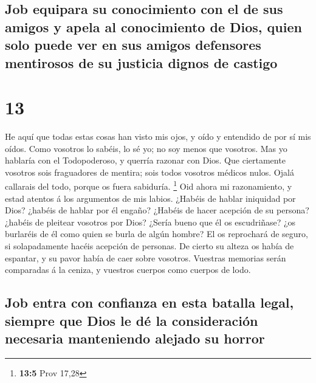 \hypertarget{job-equipara-su-conocimiento-con-el-de-sus-amigos-y-apela-al-conocimiento-de-dios-quien-solo-puede-ver-en-sus-amigos-defensores-mentirosos-de-su-justicia-dignos-de-castigo}{%
\subsection{Job equipara su conocimiento con el de sus amigos y apela al
conocimiento de Dios, quien solo puede ver en sus amigos defensores
mentirosos de su justicia dignos de
castigo}\label{job-equipara-su-conocimiento-con-el-de-sus-amigos-y-apela-al-conocimiento-de-dios-quien-solo-puede-ver-en-sus-amigos-defensores-mentirosos-de-su-justicia-dignos-de-castigo}}

\hypertarget{section-12}{%
\section{13}\label{section-12}}

 He aquí que todas estas cosas han visto mis ojos, y oído y
entendido de por sí mis oídos.  Como vosotros lo sabéis, lo
sé yo; no soy menos que vosotros.  Mas yo hablaría con el
Todopoderoso, y querría razonar con Dios.  Que ciertamente
vosotros sois fraguadores de mentira; sois todos vosotros médicos nulos.
 Ojalá callarais del todo, porque os fuera sabiduría.
\footnote{\textbf{13:5} Prov 17,28}  Oid ahora mi
razonamiento, y estad atentos á los argumentos de mis labios.
 ¿Habéis de hablar iniquidad por Dios? ¿habéis de hablar por
él engaño?  ¿Habéis de hacer acepción de su persona? ¿habéis
de pleitear vosotros por Dios?  ¿Sería bueno que él os
escudriñase? ¿os burlaréis de él como quien se burla de algún hombre?
 El os reprochará de seguro, si solapadamente hacéis
acepción de personas.  De cierto su alteza os había de
espantar, y su pavor había de caer sobre vosotros. 
Vuestras memorias serán comparadas á la ceniza, y vuestros cuerpos como
cuerpos de lodo.

\hypertarget{job-entra-con-confianza-en-esta-batalla-legal-siempre-que-dios-le-duxe9-la-consideraciuxf3n-necesaria-manteniendo-alejado-su-horror}{%
\subsection{Job entra con confianza en esta batalla legal, siempre que
Dios le dé la consideración necesaria manteniendo alejado su
horror}\label{job-entra-con-confianza-en-esta-batalla-legal-siempre-que-dios-le-duxe9-la-consideraciuxf3n-necesaria-manteniendo-alejado-su-horror}}

